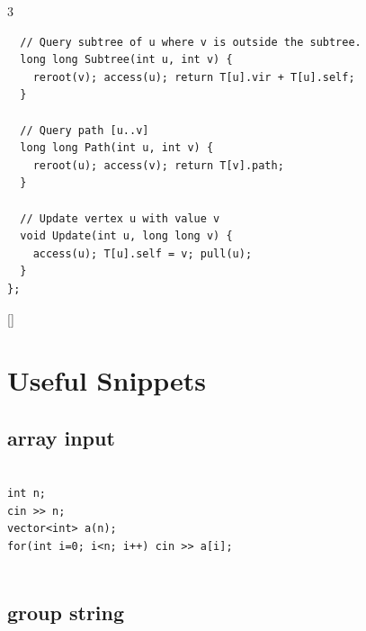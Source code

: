 \documentclass[twoside]{article}
\begin{document}
\begin{multicols*}{3}
\begin{verbatim}
  // Query subtree of u where v is outside the subtree.
  long long Subtree(int u, int v) {
    reroot(v); access(u); return T[u].vir + T[u].self;
  }
  
  // Query path [u..v]
  long long Path(int u, int v) {
    reroot(u); access(v); return T[v].path;
  }
  
  // Update vertex u with value v
  void Update(int u, long long v) {
    access(u); T[u].self = v; pull(u);
  }
};

\end{verbatim}

{
[\vspace{2em}]
\section*{Useful Snippets}
}
{
\subsection*{array input}
}
\begin{verbatim}

int n;
cin >> n;
vector<int> a(n);
for(int i=0; i<n; i++) cin >> a[i];


\end{verbatim}

{
\subsection*{group string}
}
\begin{verbatim}


\end{verbatim}
\end{multicols*}
\end{document}
